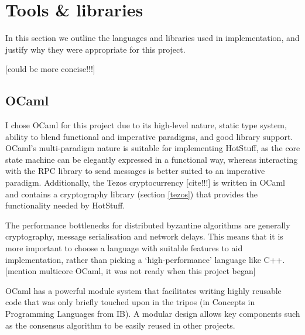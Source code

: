 


\section{Tools \& libraries} \label{tools}
In this section we outline the languages and libraries used in implementation, and justify why they were appropriate for this project.

[could be more concise!!!]

\subsection{OCaml}
I chose OCaml \cite{noauthor_ocaml_nodate} for this project due to its high-level nature, static type system, ability to blend functional and imperative paradigms, and good library support. OCaml's multi-paradigm nature is suitable for implementing HotStuff, as the core state machine can be elegantly expressed in a functional way, whereas interacting with the RPC library to send messages is better suited to an imperative paradigm. Additionally, the Tezos cryptocurrency [cite!!!] is written in OCaml and contains a cryptography library (section \ref{tezos}) that provides the functionality needed by HotStuff.

The performance bottlenecks for distributed byzantine algorithms are generally cryptography, message serialisation and network delays. This means that it is more important to choose a language with suitable features to aid implementation, rather than picking a `high-performance' language like C++. [mention multicore OCaml, it was not ready when this project began]

OCaml has a powerful module system that facilitates writing highly reusable code that was only briefly touched upon in the tripos (in Concepts in Programming Languages from IB). A modular design allows key components such as the consensus algorithm to be easily reused in other projects.

